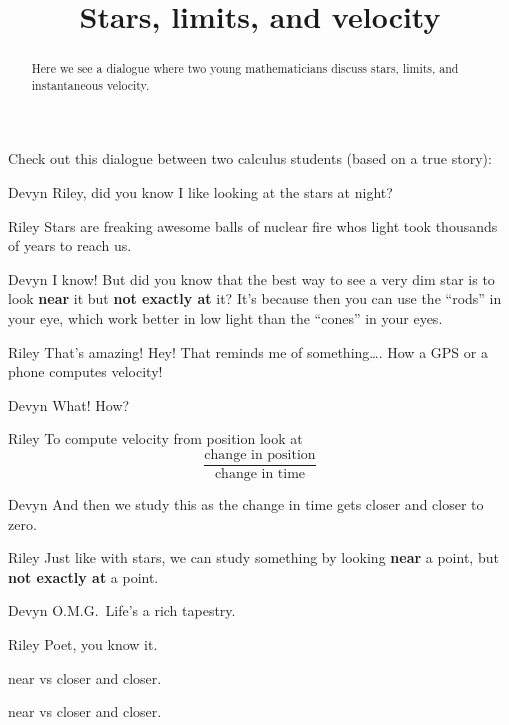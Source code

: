 \documentclass{ximera}
\title[Break-Ground:]{Stars, limits, and velocity}
\begin{document}
\begin{abstract}
Here we see a dialogue where two young mathematicians discuss stars,
limits, and instantaneous velocity.
\end{abstract}
\maketitle

Check out this dialogue between two calculus students (based on a true
story):

\begin{dialogue}
\item[Devyn] Riley, did you know I like looking at the stars at night?
\item[Riley] Stars are freaking awesome balls of nuclear fire whos
  light took thousands of years to reach us.
\item[Devyn] I know! But did you know that the best way to see a very
  dim star is to look \textbf{near} it but \textbf{not exactly at} it? It's
  because then you can use the ``rods'' in your eye, which work better
  in low light than the ``cones'' in your eyes.
\item[Riley] That's amazing! Hey! That reminds me of something\dots.
  How a GPS or a phone computes velocity!
\item[Devyn] What! How?
\item[Riley] To compute velocity from position look at
  \[
  \frac{\text{change in position}}{\text{change in time}}
  \]
\item[Devyn] And then we study this as the change in time gets closer
  and closer to zero.
\item[Riley] Just like with stars, we can study something by looking
  \textbf{near} a point, but \textbf{not exactly at} a point.
\item[Devyn] O.M.G.\ Life's a rich tapestry.
\item[Riley] Poet, you know it.
\end{dialogue}


\begin{problem}
  near vs closer and closer.
\end{problem}


\begin{problem}
  near vs closer and closer.
\end{problem}


\end{document}
